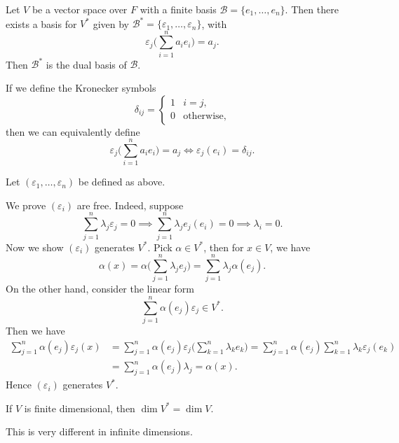 \documentclass[12pt]{article}
\begin{document}
\begin{lemma}
	Let $V$ be a vector space over $F$ with a finite basis $\mathcal{B} = \{e_1, \ldots, e_n\}$. Then there exists a basis for $V^{\ast}$ given by $\mathcal{B}^{\ast} = \{\varepsilon_1, \ldots, \varepsilon_n\}$, with
	\[
		\varepsilon_j \Biggl( \sum_{i = 1}^{n} a_i e_i \Biggr) = a_j
	.\]
	Then $\mathcal{B}^{\ast}$ is the dual basis of $\mathcal{B}$.
\end{lemma}

\begin{remark}
	If we define the Kronecker symbols
	\[
	\delta_{ij} =
	\begin{cases}
		1 & i = j, \\
		0 & \text{otherwise},
	\end{cases}
	\]
	then we can equivalently define
	\[
		\varepsilon_j \Biggl( \sum_{i = 1}^{n} a_i e_i \Biggr) = a_j \iff \varepsilon_j(e_i) = \delta_{ij}
	.\]
\end{remark}

\begin{proofbox}
	Let $(\varepsilon_1, \ldots, \varepsilon_n)$ be defined as above.

	We prove $(\varepsilon_i)$ are free. Indeed, suppose
	\[
		\sum_{j = 1}^{n} \lambda_j \varepsilon_j = 0 \implies \sum_{j = 1}^{n} \lambda_j e_j(e_i) = 0 \implies \lambda_i = 0
	.\]
	Now we show $(\varepsilon_i)$ generates $V^{\ast}$. Pick $\alpha \in V^{\ast}$, then for $x \in V$, we have
	\[
		\alpha(x) = \alpha \Biggl( \sum_{j = 1}^{n} \lambda_j e_j \Biggr) = \sum_{j = 1}^{n} \lambda_j \alpha(e_j)
	.\]
	On the other hand, consider the linear form
	\[
		\sum_{j = 1}^{n} \alpha(e_j) \varepsilon_j \in V^{\ast}
	.\]
	Then we have
	\begin{align*}
		\sum_{j = 1}^{n} \alpha(e_j) \varepsilon_j(x) &= \sum_{j = 1}^{n} \alpha(e_j) \varepsilon_j\Biggl( \sum_{k = 1}^{n} \lambda_k e_k \Biggr) = \sum_{j = 1}^{n} \alpha(e_j) \sum_{k = 1}^{n} \lambda_k \varepsilon_j (e_k) \\
							      &= \sum_{j = 1}^{n} \alpha(e_j) \lambda_j = \alpha(x).
	\end{align*}
	Hence $(\varepsilon_i)$ generates $V^{\ast}$.
\end{proofbox}


\begin{corollary}
	If $V$ is finite dimensional, then $\dim V^{\ast} = \dim V$.
\end{corollary}

This is very different in infinite dimensions.
\end{document}

